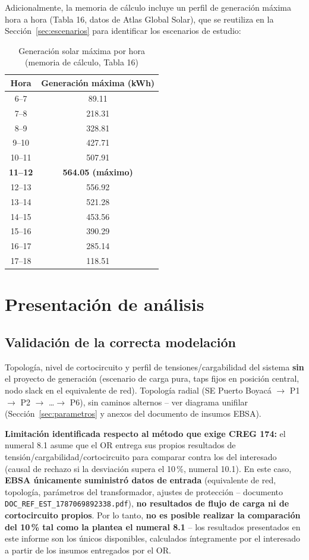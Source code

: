 \documentclass[11pt,a4paper]{article}
\begin{document}
Adicionalmente, la memoria de c\'alculo incluye un perfil de generaci\'on m\'axima hora a hora (Tabla 16, datos de Atlas Global Solar), que se reutiliza en la Secci\'on~\ref{sec:escenarios} para identificar los escenarios de estudio:
\begin{table}[H]
\centering
\caption{Generaci\'on solar m\'axima por hora (memoria de c\'alculo, Tabla 16)}
\begin{tabular}{cc}
\toprule
Hora & Generaci\'on m\'axima (kWh) \\
\midrule
6--7 & 89.11 \\
7--8 & 218.31 \\
8--9 & 328.81 \\
9--10 & 427.71 \\
10--11 & 507.91 \\
\textbf{11--12} & \textbf{564.05 (m\'aximo)} \\
12--13 & 556.92 \\
13--14 & 521.28 \\
14--15 & 453.56 \\
15--16 & 390.29 \\
16--17 & 285.14 \\
17--18 & 118.51 \\
\bottomrule
\end{tabular}
\end{table}

\section{Presentaci\'on de an\'alisis}

\subsection{Validaci\'on de la correcta modelaci\'on}
\label{sec:validacion}
Topolog\'ia, nivel de cortocircuito y perfil de tensiones/cargabilidad del sistema \textbf{sin} el proyecto de generaci\'on (escenario de carga pura, taps fijos en posici\'on central, nodo slack en el equivalente de red). Topolog\'ia radial (SE Puerto Boyac\'a $\to$ P1 $\to$ P2 $\to$ \ldots $\to$ P6), sin caminos alternos -- ver diagrama unifilar (Secci\'on~\ref{sec:parametros} y anexos del documento de insumos EBSA).

\textbf{Limitaci\'on identificada respecto al m\'etodo que exige CREG 174:} el numeral 8.1 asume que el OR entrega sus propios resultados de tensi\'on/cargabilidad/cortocircuito para comparar contra los del interesado (causal de rechazo si la desviaci\'on supera el 10\,\%, numeral 10.1). En este caso, \textbf{EBSA \'unicamente suministr\'o datos de entrada} (equivalente de red, topolog\'ia, par\'ametros del transformador, ajustes de protecci\'on -- documento \texttt{DOC\_REF\_EST\_1787069892338.pdf}), \textbf{no resultados de flujo de carga ni de cortocircuito propios}. Por lo tanto, \textbf{no es posible realizar la comparaci\'on del 10\,\% tal como la plantea el numeral 8.1} -- los resultados presentados en este informe son los \'unicos disponibles, calculados \'integramente por el interesado a partir de los insumos entregados por el OR.
\end{document}
